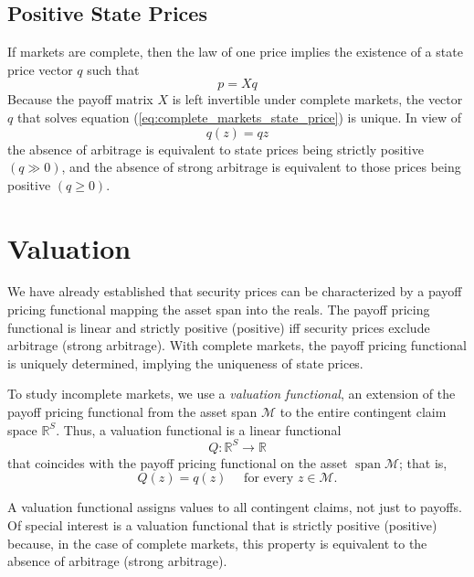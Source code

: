 \documentclass[\topdir/lecture\_notes.tex]{subfiles}
\begin{document}
\subsection{Positive State Prices}
If markets are complete, then the law of one price implies the existence of a state price vector \(q\) such that
\begin{equation}
p=X q \label{eq:complete_markets_state_price}
\end{equation}
Because the payoff matrix \(X\) is left invertible under complete markets, the vector \(q\) that solves equation (\ref{eq:complete_markets_state_price}) is unique. In view of
\begin{equation*}
q(z)=q z 
\end{equation*}
the absence of arbitrage is equivalent to state prices being strictly positive $(q \gg 0)$, and the absence of strong arbitrage is equivalent to those prices being positive $(q \geq 0)$.

\section{Valuation}
We have already established that security prices can be characterized by a payoff pricing functional mapping the asset span into the reals. The payoff pricing functional is linear and strictly positive (positive) iff security prices exclude arbitrage (strong arbitrage). With complete markets, the payoff pricing functional is uniquely determined, implying the uniqueness of state prices. 

To study incomplete markets, we use a \emph{valuation functional}, an extension of the payoff pricing functional from the asset span \(\mathcal{M}\) to the entire contingent claim space \(\mathbb{R}^{S}\). Thus, a valuation functional is a linear functional
\begin{equation*}
Q: \mathbb{R}^{S} \rightarrow \mathbb{R} 
\end{equation*}
that coincides with the payoff pricing functional on the asset \(\operatorname{span} \mathcal{M}\); that is,
\begin{equation*}
Q(z)=q(z) \quad \text { for every } z \in \mathcal{M}. 
\end{equation*}

A valuation functional assigns values to all contingent claims, not just to payoffs. Of special interest is a valuation functional that is strictly positive (positive) because, in the case of complete markets, this property is equivalent to the absence of arbitrage (strong arbitrage).
\end{document}

